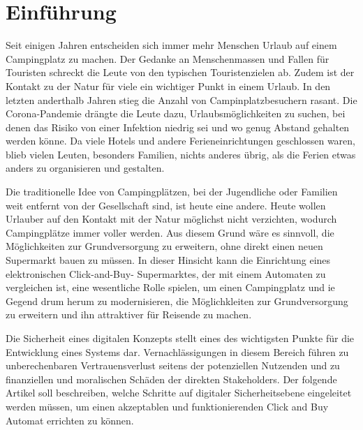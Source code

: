 \section{Einführung}


Seit einigen Jahren entscheiden sich immer mehr Menschen Urlaub auf einem Campingplatz 
zu machen. Der Gedanke an Menschenmassen und Fallen für Touristen schreckt die Leute von
den typischen Touristenzielen ab. Zudem ist der Kontakt zu der Natur für viele ein wichtiger
Punkt in einem Urlaub. In den letzten anderthalb Jahren stieg die Anzahl von Campinplatzbesuchern
rasant. Die Corona-Pandemie drängte die Leute dazu, Urlaubsmöglichkeiten zu suchen, bei denen
das Risiko von einer Infektion niedrig sei und wo genug Abstand gehalten werden könne. Da viele 
Hotels und andere Ferieneinrichtungen geschlossen waren, blieb vielen Leuten, besonders Familien,
nichts anderes übrig, als die Ferien etwas anders zu organisieren und gestalten.

Die traditionelle Idee von Campingplätzen, bei der Jugendliche oder Familien weit entfernt von der 
Gesellschaft sind, ist heute eine andere. Heute wollen Urlauber auf den Kontakt mit der Natur
möglichst nicht verzichten, wodurch Campingplätze immer voller werden. Aus diesem Grund wäre es
sinnvoll, die Möglichkeiten zur Grundversorgung zu erweitern, ohne direkt einen neuen Supermarkt
bauen zu müssen. In dieser Hinsicht kann die Einrichtung eines elektronischen Click-and-Buy-
Supermarktes, der mit einem Automaten zu vergleichen ist, eine wesentliche Rolle spielen, um 
einen Campingplatz und ie Gegend drum herum zu modernisieren, die Möglichkleiten zur Grundversorgung 
zu erweitern und ihn attraktiver für Reisende zu machen.

Die Sicherheit eines digitalen Konzepts stellt eines des wichtigsten Punkte für die Entwicklung
eines Systems dar. Vernachlässigungen in diesem Bereich führen zu unberechenbaren Vertrauensverlust 
seitens der potenziellen Nutzenden und zu finanziellen und moralischen Schäden der direkten
Stakeholders. Der folgende Artikel soll beschreiben, welche Schritte auf digitaler Sicherheitsebene 
eingeleitet werden müssen, um einen akzeptablen und funktionierenden Click and Buy Automat errichten 
zu können. 